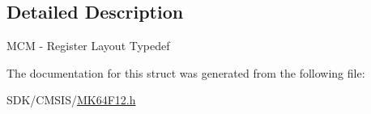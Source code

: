 \subsection{Detailed Description}
M\+CM -\/ Register Layout Typedef 

The documentation for this struct was generated from the following file\+:\begin{DoxyCompactItemize}
\item 
S\+D\+K/\+C\+M\+S\+I\+S/\mbox{\hyperlink{_m_k64_f12_8h}{M\+K64\+F12.\+h}}\end{DoxyCompactItemize}
